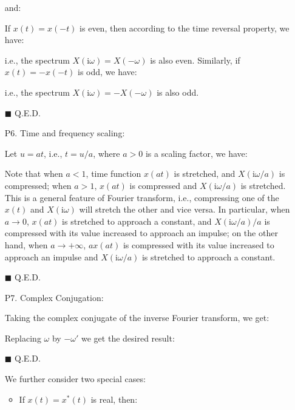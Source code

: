 \begin{itemize}
	and:
	
	\begin{dem} If $x(t)=x(-t)$ is even, then according to the time reversal property, we have:
	
	i.e., the spectrum $X(\mathrm{i}\omega)=X(-\omega)$ is also even. Similarly, if $x(t)=-x(-t)$ is odd, we have:
	
	i.e., the spectrum $X(\mathrm{i}\omega)=-X(-\omega)$ is also odd.
	\begin{flushright}
		$\blacksquare$  Q.E.D.
	\end{flushright}
	\end{dem}
	
	\item[P6.] Time and frequency scaling:
	
	\begin{dem}
	Let $u=at$, i.e., $t=u/a$, where $a>0$ is a scaling factor, we have:
	
	Note that when $a<1$, time function $x(at)$ is stretched, and $X(\mathrm{i}\omega/a)$ is compressed; when $a>1$, $x(at)$ is compressed and $X(\mathrm{i}\omega/a)$ is stretched.	This is a general feature of Fourier transform, i.e., compressing one of the $x(t)$ and $X(\mathrm{i}\omega)$ will stretch the other and vice versa. In particular, when $a\rightarrow 0$, $x(at)$ is stretched to approach a constant, and $X(\mathrm{i}\omega/a)/a$ is compressed with its value increased to approach an impulse; on the other	hand, when $a \rightarrow +\infty$, $ax(at)$ is compressed with its value increased to approach an impulse and $X(\mathrm{i}\omega/a)$ is stretched to approach a constant.
	\begin{flushright}
		$\blacksquare$  Q.E.D.
	\end{flushright}
	\end{dem}
	
	\item[P7.] Complex Conjugation:
	
	
	\begin{dem} Taking the complex conjugate of the inverse Fourier transform, we get:
	
	Replacing $\omega$ by $-\omega'$ we get the desired result:
	
	\begin{flushright}
		$\blacksquare$  Q.E.D.
	\end{flushright}
	\end{dem}
	We further consider two special cases:
	\begin{itemize}
	\item If $x(t)=x^*(t)$ is real, then:
	

\end{itemize}
\end{itemize}
